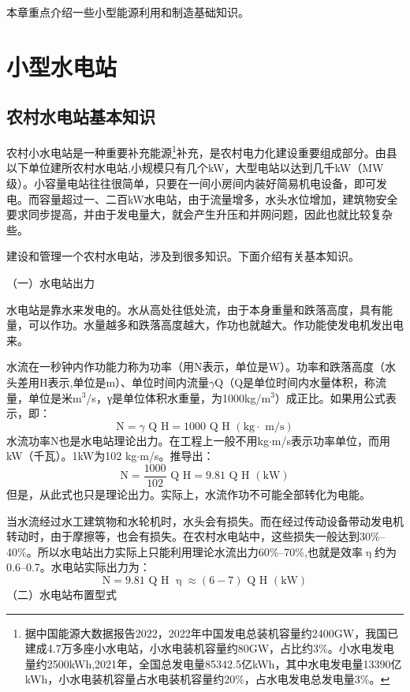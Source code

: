 \documentclass{ctexbook}
\begin{document}
本章重点介绍一些小型能源利用和制造基础知识。
\section{小型水电站}
\subsection{农村水电站基本知识}
农村小水电站是一种重要补充能源\footnote{据中国能源大数据报告2022，2022年中国发电总装机容量约2400GW，我国已建成4.7万多座小水电站，小水电装机容量约80GW，占比约3\%。小水电发电量约2500kWh,2021年，全国总发电量85342.5亿kWh，其中水电发电量13390亿kWh，小水电装机容量占水电装机容量约20\%，占水电发电总发电量3\%。}补充，是农村电力化建设重要组成部分。由县以下单位建所农村水电站,小规模只有几个kW，大型电站以达到几千kW（MW级）。小容量电站往往很简单，只要在一间小房间内装好简易机电设备，即可发电。而容量超过一、二百kW水电站，由于流量增多，水头水位增加，建筑物安全要求同步提高，并由于发电量大，就会产生升压和并网问题，因此也就比较复杂些。

建设和管理一个农村水电站，涉及到很多知识。下面介绍有关基本知识。

（一）水电站出力

水电站是靠水来发电的。水从高处往低处流，由于本身重量和跌落高度，具有能量，可以作功。水量越多和跌落高度越大，作功也就越大。作功能使发电机发出电来。

水流在一秒钟内作功能力称为功率（用N表示，单位是W）。功率和跌落高度（水头差用H表示,单位是m）、单位时间内流量$\gamma$Q（Q是单位时间内水量体积，称流量，单位是米m$^3$/s，γ是单位体积水重量，为1000kg/m$^3$）成正比。如果用公式表示，即：
\begin{equation*}
\text{N}=\gamma \text{ Q H}=1000\text{ Q H }( \text{kg$\cdot$ m/s} )
\end{equation*}
水流功率N也是水电站理论出力。在工程上一般不用kg$\cdot$m/s表示功率单位，而用kW（千瓦）。1kW为102 kg$\cdot$m/s。推导出：
\begin{equation*}
\text{N}=\frac{1000}{102}\text{ Q H}=9.81 \text{ Q H } (\text{kW})
\end{equation*}
但是，从此式也只是理论出力。实际上，水流作功不可能全部转化为电能。

当水流经过水工建筑物和水轮机时，水头会有损失。而在经过传动设备带动发电机转动时，由于摩擦等，也会有损失。在农村水电站中，这些损失一般达到30\%--40\%。所以水电站出力实际上只能利用理论水流出力60\%--70\%,也就是效率$\upeta$约为0.6--0.7。水电站实际出力为：
\begin{equation*}
\text{N}=9.81\text{ Q H }\upeta \approx (6-7)\text{ Q H } (\text{kW})
\end{equation*}
（二）水电站布置型式
\end{document}
